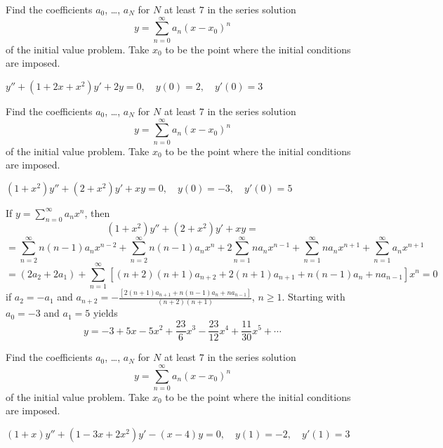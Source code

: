 \documentclass{ximera}
\begin{document}
\begin{problem}\label{exer:7.3.41}
Find
the coefficients  $a_0$, \dots, $a_N$ for $N$ at least $7$
in the series solution
$$
y=\sum_{n=0}^\infty a_n(x-x_0)^n
$$
of the initial value problem. Take $x_0$ to be the point where the
initial conditions are imposed.

$y''+(1+2x+x^2)y'+2y=0,\quad y(0)=2,\quad y'(0)=3$
\end{problem}

\begin{problem}\label{exer:7.3.42}
Find
the coefficients  $a_0$, \dots, $a_N$ for $N$ at least $7$
in the series solution
$$
y=\sum_{n=0}^\infty a_n(x-x_0)^n
$$
of the initial value problem. Take $x_0$ to be the point where the
initial conditions are imposed.

$(1+x^2)y''+(2+x^2)y'+xy=0,\quad y(0)=-3,\quad y'(0)=5$

\begin{solution}
    If $y=\sum_{n=0}^\infty a_nx^n$, then
$$(1+x^2)y''+(2+x^2)y'+xy=$$
$$=\sum_{n=2}^\infty n(n-1)a_nx^{n-2}
+\sum_{n=2}^\infty n(n-1)a_nx^n
+2\sum_{n=1}^\infty na_nx^{n-1}
+\sum_{n=1}^\infty na_nx^{n+1}
+\sum_{n=1}^\infty a_nx^{n+1}$$
$$=(2a_2+2a_1)+
\sum_{n=1}^\infty[(n+2)(n+1)a_{n+2}+2(n+1)a_{n+1}+n(n-1)a_n+na_{n-1}]x^n=0$$
if
$a_2=-a_1$ and
$a_{n+2}=-\frac{[2(n+1)a_{n+1}+n(n-1)a_n+na_{n-1}]}{(n+2)(n+1)}$,
 $n\geq 1$.
Starting with $a_0=-3$ and $a_1=5$ yields
$$y=-3+5x-5x^2+\frac{23}{6}x^3-\frac{23}{12}x^4+\frac{11}{30}x^5+\cdots$$
\end{solution}
\end{problem}

\begin{problem}\label{exer:7.3.43}
Find
the coefficients  $a_0$, \dots, $a_N$ for $N$ at least $7$
in the series solution
$$
y=\sum_{n=0}^\infty a_n(x-x_0)^n
$$
of the initial value problem. Take $x_0$ to be the point where the
initial conditions are imposed.

$(1+x)y''+(1-3x+2x^2)y'-(x-4)y=0,\quad y(1)=-2,\quad y'(1)=3$
\end{problem}
\end{document}
